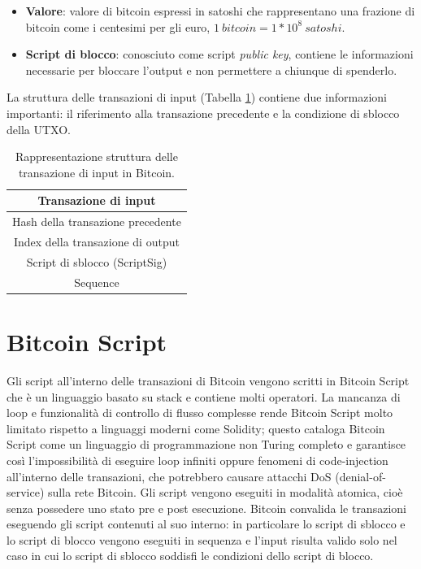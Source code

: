\begin{itemize}
  \item {\bf Valore\/}: valore di bitcoin espressi in satoshi che rappresentano una frazione di bitcoin come i centesimi per gli euro, \( 1\: bitcoin = 1*10^8 \: satoshi \).
  \item {\bf Script di blocco\/}: conosciuto come script \emph{public key}, contiene le informazioni necessarie per bloccare l’output e non permettere a chiunque di spenderlo.
\end{itemize}

La struttura delle transazioni di input (Tabella \ref{tab:inputtransaztionbitcoin}) contiene due informazioni importanti: il riferimento alla transazione precedente e la condizione di sblocco della UTXO.

\begin{table}[H]
       \centering\small
           \begin{tabular}{|c|}
               \hline
               \textbf{Transazione di input}\\
               \hline \hline
               Hash della transazione precedente   \\
               \hline
               Index della transazione di output \\
               \hline
               Script di sblocco (ScriptSig) \\
               \hline
               Sequence \\
               \hline
       \end{tabular}
       \caption{Rappresentazione struttura delle transazione di input in Bitcoin.\label{tab:inputtransaztionbitcoin}}
   \end{table}

\section{Bitcoin Script} \label{sec:bitcoinScriptBitcoin}

Gli script all’interno delle transazioni di Bitcoin vengono scritti in Bitcoin Script che è un linguaggio basato su stack e contiene molti operatori.\newline
La mancanza di loop e funzionalità di controllo di flusso complesse rende Bitcoin Script molto limitato rispetto a linguaggi moderni come Solidity; questo cataloga Bitcoin Script come un linguaggio di programmazione non Turing completo e garantisce così l’impossibilità di eseguire loop infiniti oppure fenomeni di code-injection all’interno delle transazioni, che potrebbero causare attacchi DoS (denial-of-service) sulla rete Bitcoin.\newline
Gli script vengono eseguiti in modalità atomica, cioè senza possedere uno stato pre e post esecuzione. Bitcoin convalida le transazioni eseguendo gli script contenuti al suo interno: in particolare lo script di sblocco e lo script di blocco vengono eseguiti in sequenza e l'input risulta valido solo nel caso in cui lo script di sblocco soddisfi le condizioni dello script di blocco.

